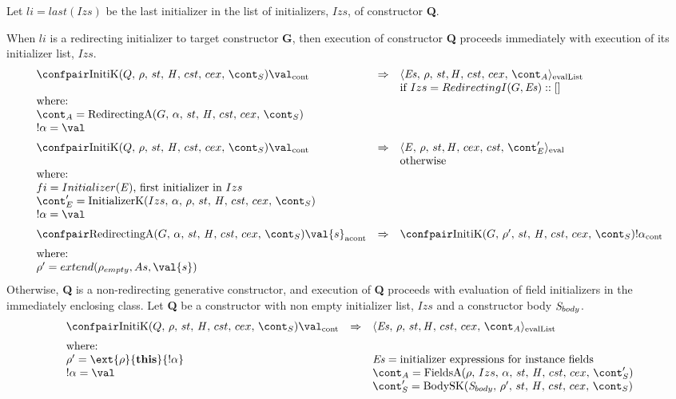 \documentclass{article}
\begin{document}
\noindent
Let $li = last(Izs)$ be the last initializer in the list of initializers, $Izs$, of constructor \textbf{Q}.

\noindent
When $li$ is a redirecting initializer to target constructor \textbf{G}, then execution of constructor \textbf{Q} proceeds immediately with execution of its initializer list, $Izs$.
\[
  \begin{array}{lcl}
	\contconf{\InitK{Q}{\env}{\scont}}{\val}
	& \Rightarrow &
	\evallistconf{\exprs}{\env}{\strace}{\cstrace}{\cex}{\acont}\\	
	&&
	\textrm{if } Izs = RedirectingI(G, \exprs) :: []\\
	\textrm{where:}\\
	\acont = \RedirectingA{G}{\loc}{\scont}\\
	\deref{\loc} = \val
	\\[2mm]

	\contconf{\InitK{Q}{\env}{\scont}}{\val}
	& \Rightarrow &
	\evalconf{\expr}{\env}{st}{cex}{cst}{\econt'}\\
	&&
	\textrm{otherwise}\\
	\textrm{where:}\\

	fi = Initializer(\expr) \textrm{, first initializer in }Izs\\
	\econt' = \InitializerK{Izs}{\loc}{\env}{\scont}\\
	\deref{\loc} = \val\\[2mm]

	\acontconf{\RedirectingA{G}{\loc}{\scont}}{\val{s}}
	& \Rightarrow &
	\contconf{\InitK{G}{\env'}{\scont}}{\deref{\loc}}\\[2mm]
	\textrm{where:}\\
	\env' = extend(\env_{empty}, \formals, \val{s})
  \end{array}
\]
\noindent
Otherwise, \textbf{Q} is a non-redirecting generative constructor, and execution of \textbf{Q} proceeds with evaluation of field initializers in the immediately enclosing class.
\noindent
Let \textbf{Q} be a constructor with non empty initializer list, $Izs$ and a constructor body $\mathit{S}_{body}$.
\[
  \begin{array}{lcl}
	\contconf{\InitK{Q}{\env}{\scont}}{\val}
	& \Rightarrow &
	\evallistconf{\exprs}{\env}{\strace}{\cstrace}{\cex}{\acont}\\[2mm]

	\textrm{where:}\\
	\env' = \ext{\env}{\mathbf{this}}{\deref{\loc}}
	&&
	\exprs = \textrm{initializer expressions for instance fields}\\
	\deref{\loc} = \val
	&&
	\acont = \FieldsA{\env}{Izs}{\loc}{\scont'}\\
	&&
	\scont' = \BodySK{\stmt_{body}}{\env'}{\scont}
  \end{array}
\]
\end{document}
